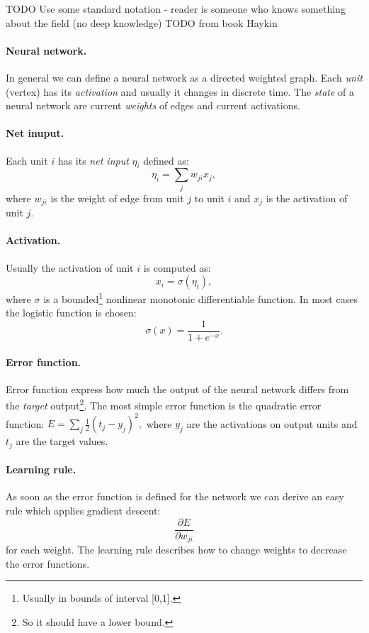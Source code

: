 
TODO Use some standard notation - reader is someone who knows something about the field (no deep knowledge) 
TODO from book Haykin 

\paragraph{Neural network.}

In general we can define a neural network as a directed weighted graph. Each \emph{unit} (vertex) has its \emph{activation} and usually it changes in discrete time. The \emph{state} of a neural network are current \emph{weights} of edges and current activations. 

\paragraph{Net inuput.}
Each unit $i$ has its \emph{net input} $\eta_i$ defined as:
$$\eta_i = \sum_j w_{ji}x_j,$$
where $w_{ji}$ is the weight of edge from unit $j$ to unit $i$ and $x_j$ is the activation of unit $j$.

\paragraph{Activation.}
Usually the activation of unit $i$ is computed as:
$$x_i = \sigma(\eta_i),$$
where $\sigma$ is a bounded\footnote{
Usually in bounds of interval [0,1].
} nonlinear monotonic differentiable function. In most cases the logistic function is chosen:
$$\sigma(x) = \frac{1}{1 + e^{-x}}.$$

\paragraph{Error function.}
Error function express how much the output of the neural network differs from the \emph{target} output\footnote{
So it should have a lower bound. 
}. The most simple error function is the quadratic error function:
$E = \sum_j \frac{1}{2}(t_j-y_j)^2,$
where $y_j$ are the activations on output units and $t_j$ are the target values.

\paragraph{Learning rule.}
As soon as the error function is defined for the network we can derive an easy rule which applies gradient descent: 
$$\frac{\partial E}{\partial w_{ji}}$$
for each weight. The learning rule describes how to change weights to decrease the error functions.

